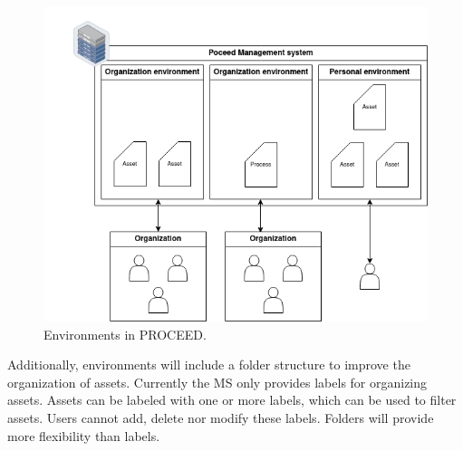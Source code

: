 \begin{figure}[H]
    \centering
    \includegraphics[scale=0.45]{images/proceed-workspaces-v2.drawio.png}
    \caption{Environments in PROCEED.}
    \label{fig:proceed-envitonments-overview}
\end{figure}
Additionally, environments will include a folder structure to improve the organization of
assets.
Currently the MS only provides labels for organizing assets.
Assets can be labeled with one or more labels, which can be used to filter assets. 
Users cannot add, delete nor modify these labels.
Folders will provide more flexibility than labels.


%
%

